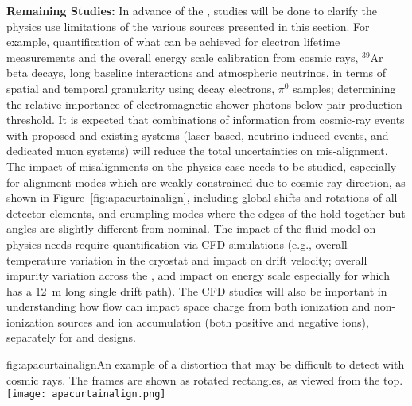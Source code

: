 \textbf{Remaining Studies:} In advance of the , studies will be done to clarify the physics use limitations of the various sources presented in this section. %
For example, quantification of what can be achieved for  electron lifetime measurements and the overall energy scale calibration from cosmic rays,  ${}^{39}$Ar beta decays, long baseline interactions and atmospheric neutrinos, in terms of spatial and temporal granularity using decay electrons, $\pi^0$ samples; determining the relative importance of electromagnetic shower photons below pair production threshold. It is expected that combinations of information from cosmic-ray events with proposed and existing systems (laser-based, neutrino-induced events, and dedicated muon systems) will reduce the total uncertainties on mis-alignment.  The impact of misalignments on the physics case needs to be studied, especially for alignment modes which are weakly constrained due to cosmic ray direction, as shown in Figure~\ref{fig:apacurtainalign}, including global shifts and rotations of all detector elements, and crumpling modes where the edges of the  hold together but angles are slightly different from nominal. The impact of the fluid model on physics needs require quantification via CFD simulations (e.g., overall temperature variation in the cryostat and impact on drift velocity; overall impurity variation across the \detmodule{}, and impact on energy scale especially for  which has a \SI{12}{\m} long single drift path). The CFD studies will also be important in understanding how \lar flow can impact space charge from both ionization and non-ionization sources and ion accumulation (both positive and negative ions), separately for  and  designs. %

\begin{dunefigure}{fig:apacurtainalign}{An example of a distortion that may be difficult to detect with cosmic rays.  The  frames are shown as
rotated rectangles, as viewed from the top.}
\texttt{[image: apacurtainalign.png]}
\end{dunefigure}

